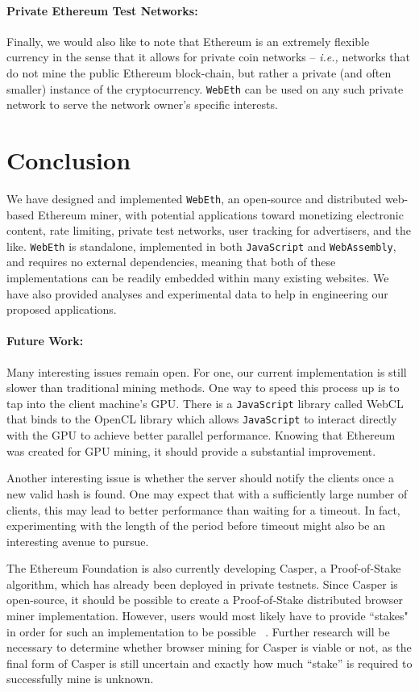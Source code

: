 \documentclass[runningheads]{llncs}
\begin{document}
\paragraph{Private Ethereum Test Networks:}
Finally, we would also like to note that Ethereum is an extremely flexible currency in the sense that it allows for private coin networks -- \emph{i.e.,} networks that do not mine the public Ethereum block-chain, but rather a private (and often smaller) instance of the cryptocurrency. \verb|WebEth| can be used on any such private network to serve the network owner's specific interests.

\section{Conclusion}
\label{sec:conclusion}
We have designed and implemented \verb|WebEth|, an open-source and  distributed web-based Ethereum miner, with potential applications toward monetizing electronic content, rate limiting, private test networks, user tracking for advertisers, and the like. \verb|WebEth| is standalone, implemented in both \verb|JavaScript| and \verb|WebAssembly|, and requires no external dependencies, meaning that both of these implementations can be readily embedded within many existing websites.  We have also provided analyses and experimental data to help in engineering our proposed applications.

\paragraph{Future Work:}
Many interesting issues remain open.  For one, our current implementation is still slower than traditional mining methods. One way to speed this process up is to tap into the client machine's GPU. There is a \verb|JavaScript| library called WebCL that binds to the OpenCL library which allows \verb|JavaScript| to interact directly with the GPU to achieve better parallel performance. Knowing that Ethereum was created for GPU mining, it should provide a substantial improvement. 

Another interesting issue is whether the server should notify the clients once a new valid hash is found. One may expect that with a sufficiently large number of clients, this may lead to better performance than waiting for a timeout. In fact, experimenting with the length of the period before timeout might also be an interesting avenue to pursue.

The Ethereum Foundation is also currently developing Casper, a Proof-of-Stake algorithm, which has already been deployed in private testnets. Since Casper is open-source, it should be possible to create a Proof-of-Stake distributed browser miner implementation. However, users would most likely have to provide ``stakes" in order for such an implementation to be possible ~\cite{PoSproof}. Further research will be necessary to determine whether browser mining for Casper is viable or not, as the final form of Casper is still uncertain and exactly how much ``stake'' is required to successfully mine is unknown.
\end{document}
